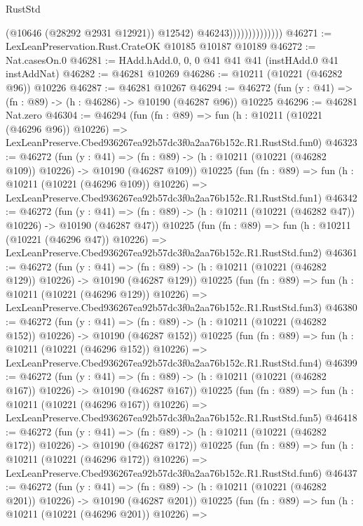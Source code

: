 \begin{lexlean}{RustStd}
\begin{coremodule}
                                  (@10646 (@28292 @2931 @12921))
                                  @12542)
                                @46243))))))))))))))
@46271 := LexLeanPreservation.Rust.CrateOK @10185 @10187 @10189
@46272 := Nat.casesOn.{0}
@46281 := HAdd.hAdd.{0, 0, 0} @41 @41 @41 (instHAdd.{0} @41 instAddNat)
@46282 := @46281 @10269
@46286 := @10211 (@10221 (@46282 @96)) @10226
@46287 := @46281 @10267
@46294 := @46272 (fun (y : @41) => (fn : @89) -> (h : @46286) -> @10190 (@46287 @96)) @10225
@46296 := @46281 Nat.zero
@46304 := @46294
    (fun (fn : @89) =>
    fun (h : @10211 (@10221 (@46296 @96)) @10226) =>
    LexLeanPreserve.Cbed936267ea92b57dc3f0a2aa76b152c.R1.RustStd.fun0)
@46323 := @46272
    (fun (y : @41) =>
    (fn : @89) -> (h : @10211 (@10221 (@46282 @109)) @10226) -> @10190 (@46287 @109))
    @10225
    (fun (fn : @89) =>
    fun (h : @10211 (@10221 (@46296 @109)) @10226) =>
    LexLeanPreserve.Cbed936267ea92b57dc3f0a2aa76b152c.R1.RustStd.fun1)
@46342 := @46272
    (fun (y : @41) =>
    (fn : @89) -> (h : @10211 (@10221 (@46282 @47)) @10226) -> @10190 (@46287 @47))
    @10225
    (fun (fn : @89) =>
    fun (h : @10211 (@10221 (@46296 @47)) @10226) =>
    LexLeanPreserve.Cbed936267ea92b57dc3f0a2aa76b152c.R1.RustStd.fun2)
@46361 := @46272
    (fun (y : @41) =>
    (fn : @89) -> (h : @10211 (@10221 (@46282 @129)) @10226) -> @10190 (@46287 @129))
    @10225
    (fun (fn : @89) =>
    fun (h : @10211 (@10221 (@46296 @129)) @10226) =>
    LexLeanPreserve.Cbed936267ea92b57dc3f0a2aa76b152c.R1.RustStd.fun3)
@46380 := @46272
    (fun (y : @41) =>
    (fn : @89) -> (h : @10211 (@10221 (@46282 @152)) @10226) -> @10190 (@46287 @152))
    @10225
    (fun (fn : @89) =>
    fun (h : @10211 (@10221 (@46296 @152)) @10226) =>
    LexLeanPreserve.Cbed936267ea92b57dc3f0a2aa76b152c.R1.RustStd.fun4)
@46399 := @46272
    (fun (y : @41) =>
    (fn : @89) -> (h : @10211 (@10221 (@46282 @167)) @10226) -> @10190 (@46287 @167))
    @10225
    (fun (fn : @89) =>
    fun (h : @10211 (@10221 (@46296 @167)) @10226) =>
    LexLeanPreserve.Cbed936267ea92b57dc3f0a2aa76b152c.R1.RustStd.fun5)
@46418 := @46272
    (fun (y : @41) =>
    (fn : @89) -> (h : @10211 (@10221 (@46282 @172)) @10226) -> @10190 (@46287 @172))
    @10225
    (fun (fn : @89) =>
    fun (h : @10211 (@10221 (@46296 @172)) @10226) =>
    LexLeanPreserve.Cbed936267ea92b57dc3f0a2aa76b152c.R1.RustStd.fun6)
@46437 := @46272
    (fun (y : @41) =>
    (fn : @89) -> (h : @10211 (@10221 (@46282 @201)) @10226) -> @10190 (@46287 @201))
    @10225
    (fun (fn : @89) =>
    fun (h : @10211 (@10221 (@46296 @201)) @10226) =>

\end{coremodule}
\end{lexlean}
